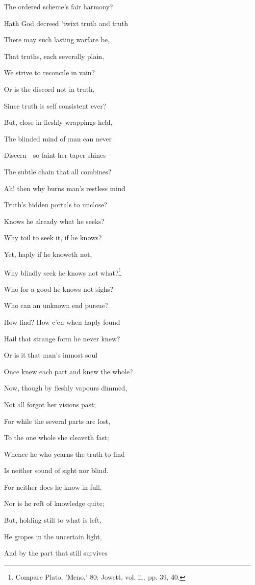 The ordered scheme's fair harmony?

Hath God decreed 'twixt truth and truth

There may such lasting warfare be,

That truths, each severally plain,

We strive to reconcile in vain?

Or is the discord not in truth,

Since truth is self consistent ever?

But, close in fleshly wrappings held,

The blinded mind of man can never

Discern—so faint her taper shines—

The subtle chain that all combines?

Ah! then why burns man's restless mind

Truth's hidden portals to unclose?

Knows he already what he seeks?

Why toil to seek it, if he knows?

Yet, haply if he knoweth not,

Why blindly seek he knows not what?\footnote{Compare Plato, 'Meno,' 80; Jowett, vol. ii., pp. 39, 40.}

Who for a good he knows not sighs?

Who can an unknown end pursue?

How find? How e'en when haply found

Hail that strange form he never knew?

Or is it that man's inmost soul

Once knew each part and knew the whole?

Now, though by fleshly vapours dimmed,

Not all forgot her visions past;

For while the several parts are lost,

To the one whole she cleaveth fast;

Whence he who yearns the truth to find

Is neither sound of sight nor blind.

For neither does he know in full,

Nor is he reft of knowledge quite;

But, holding still to what is left,

He gropes in the uncertain light,

And by the part that still survives

